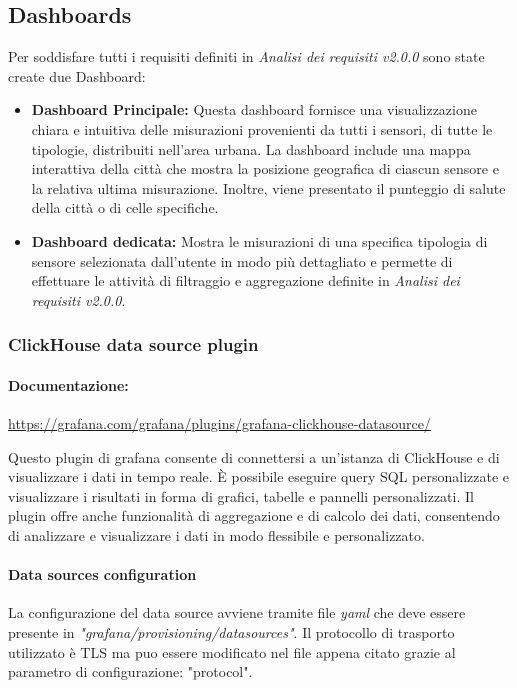 \subsection{Dashboards}
Per soddisfare tutti i requisiti definiti in \textit{Analisi dei requisiti v2.0.0} sono state create due Dashboard:
\begin{itemize}
    \item \textbf{Dashboard Principale:} Questa dashboard fornisce una visualizzazione chiara e intuitiva delle misurazioni provenienti da tutti i sensori, di tutte le tipologie, distribuiti nell'area urbana. La dashboard include una mappa interattiva della città che mostra la posizione geografica di ciascun sensore e la relativa ultima misurazione. Inoltre, viene presentato il punteggio di salute della città o di celle specifiche.
    \item \textbf{Dashboard dedicata:} Mostra le misurazioni di una specifica tipologia di sensore selezionata dall'utente in modo più dettagliato e permette di effettuare le attività di filtraggio e aggregazione definite in \textit{Analisi dei requisiti v2.0.0}.
\end{itemize}




\subsubsection{ClickHouse data source plugin} \label{sec:click_plugin}
\paragraph{Documentazione:} \href{https://grafana.com/grafana/plugins/grafana-clickhouse-datasource/}{https://grafana.com/grafana/plugins/grafana-clickhouse-datasource/}

Questo plugin di grafana consente di connettersi a un'istanza di ClickHouse e di visualizzare i dati in tempo reale. È possibile eseguire query SQL personalizzate e visualizzare i risultati in forma di grafici, tabelle e pannelli personalizzati. Il plugin offre anche funzionalità di aggregazione e di calcolo dei dati, consentendo di analizzare e visualizzare i dati in modo flessibile e personalizzato.

\paragraph{Data sources configuration}
La configurazione del data source avviene tramite file \textit{yaml} che deve essere presente in \textit{"grafana/provisioning/datasources"}.
Il protocollo di trasporto utilizzato è TLS ma puo essere modificato nel file appena citato grazie al parametro di configurazione: "protocol".

